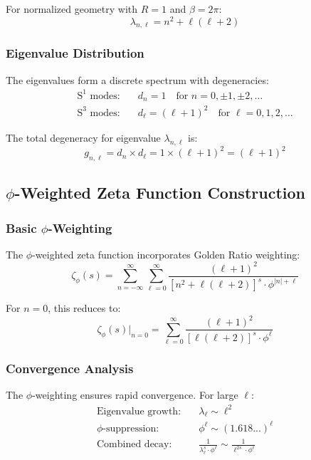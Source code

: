 For normalized geometry with $R = 1$ and $\beta = 2\pi$:
\begin{equation}
\lambda_{n,\ell} = n^2 + \ell(\ell+2)
\end{equation}

\subsubsection{Eigenvalue Distribution}

The eigenvalues form a discrete spectrum with degeneracies:
\begin{align}
\text{S}^1 \text{ modes:} &\quad d_n = 1 \quad \text{for } n = 0, \pm 1, \pm 2, \ldots\\
\text{S}^3 \text{ modes:} &\quad d_\ell = (\ell+1)^2 \quad \text{for } \ell = 0, 1, 2, \ldots
\end{align}

The total degeneracy for eigenvalue $\lambda_{n,\ell}$ is:
\begin{equation}
g_{n,\ell} = d_n \times d_\ell = 1 \times (\ell+1)^2 = (\ell+1)^2
\end{equation}

\subsection{$\phi$-Weighted Zeta Function Construction}

\subsubsection{Basic $\phi$-Weighting}

The $\phi$-weighted zeta function incorporates Golden Ratio weighting:
\begin{equation}
\zeta_\phi(s) = \sum_{n=-\infty}^{\infty} \sum_{\ell=0}^{\infty} \frac{(\ell+1)^2}{[n^2 + \ell(\ell+2)]^s \cdot \phi^{|n|+\ell}}
\end{equation}

For $n = 0$, this reduces to:
\begin{equation}
\zeta_\phi(s)\big|_{n=0} = \sum_{\ell=0}^{\infty} \frac{(\ell+1)^2}{[\ell(\ell+2)]^s \cdot \phi^\ell}
\end{equation}

\subsubsection{Convergence Analysis}

The $\phi$-weighting ensures rapid convergence. For large $\ell$:
\begin{align}
\text{Eigenvalue growth:} &\quad \lambda_\ell \sim \ell^2\\
\text{$\phi$-suppression:} &\quad \phi^\ell \sim (1.618...)^\ell\\
\text{Combined decay:} &\quad \frac{1}{\lambda_\ell^s \cdot \phi^\ell} \sim \frac{1}{\ell^{2s} \cdot \phi^\ell}
\end{align}

